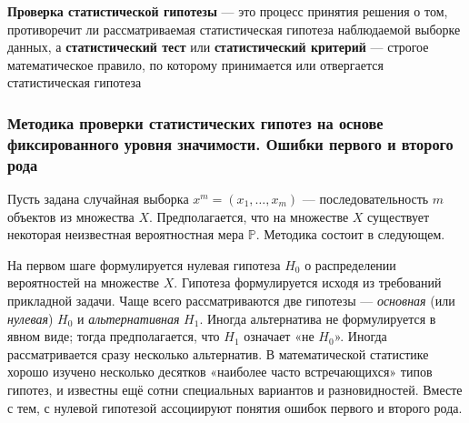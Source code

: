 \documentclass[11pt]{article}
\begin{document}
\textbf{Проверка статистической гипотезы} --- это процесс принятия
решения о том, противоречит ли рассматриваемая статистическая гипотеза
наблюдаемой выборке данных, а \textbf{статистический тест} или
\textbf{статистический критерий} --- строгое математическое правило, по
которому принимается или отвергается статистическая гипотеза

\subsubsection{Методика проверки статистических гипотез на основе
фиксированного уровня значимости. Ошибки первого и второго
рода}\label{ux43cux435ux442ux43eux434ux438ux43aux430-ux43fux440ux43eux432ux435ux440ux43aux438-ux441ux442ux430ux442ux438ux441ux442ux438ux447ux435ux441ux43aux438ux445-ux433ux438ux43fux43eux442ux435ux437-ux43dux430-ux43eux441ux43dux43eux432ux435-ux444ux438ux43aux441ux438ux440ux43eux432ux430ux43dux43dux43eux433ux43e-ux443ux440ux43eux432ux43dux44f-ux437ux43dux430ux447ux438ux43cux43eux441ux442ux438.-ux43eux448ux438ux431ux43aux438-ux43fux435ux440ux432ux43eux433ux43e-ux438-ux432ux442ux43eux440ux43eux433ux43e-ux440ux43eux434ux430}

Пусть задана случайная выборка \(x^m = (x_1,\ldots,x_m)\) ---
последовательность \(m\) объектов из множества \(X\). Предполагается,
что на множестве \(X\) существует некоторая неизвестная вероятностная
мера \(\mathbb{P}\). Методика состоит в следующем.

На первом шаге формулируется нулевая гипотеза \(H_0\) о распределении
вероятностей на множестве \(X\). Гипотеза формулируется исходя из
требований прикладной задачи. Чаще всего рассматриваются две гипотезы
--- \emph{основная} (или \emph{нулевая}) \(H_0\) и \emph{альтернативная}
\(H_1\). Иногда альтернатива не формулируется в явном виде; тогда
предполагается, что \(H_1\) означает «не \(H_0\)». Иногда
рассматривается сразу несколько альтернатив. В математической статистике
хорошо изучено несколько десятков «наиболее часто встречающихся» типов
гипотез, и известны ещё сотни специальных вариантов и разновидностей.
Вместе с тем, с нулевой гипотезой ассоциируют понятия ошибок первого и
второго рода.
\end{document}
